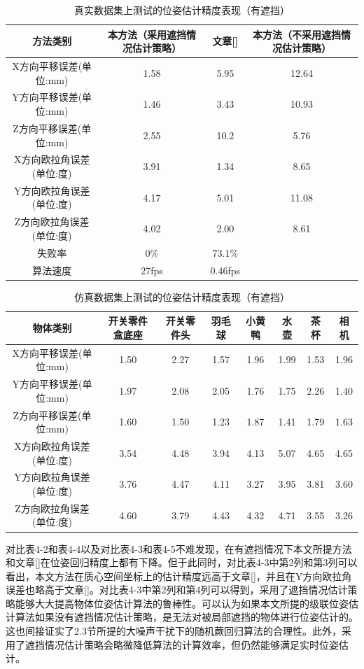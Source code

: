 \begin{table}[htb]
	\caption{真实数据集上测试的位姿估计精度表现（有遮挡）} 
	\centering 
	\begin{tabular}[t]{
		cccc} 
		\toprule
		方法类别 & 本方法（采用遮挡情况估计策略） & 文章[\citenum{drost2010model}] & 本方法（不采用遮挡情况估计策略）\\ 
		\midrule
		X方向平移误差(单位:mm) & 1.58 & 5.95 & 12.64\\
		Y方向平移误差(单位:mm) & 1.46 & 3.43 & 10.93\\
		Z方向平移误差(单位:mm) & 2.55 & 10.2 & 5.76\\
		X方向欧拉角误差(单位:度) & 3.91 & 1.34 & 8.65\\
		Y方向欧拉角误差(单位:度) & 4.17 & 5.01 & 11.08\\
		Z方向欧拉角误差(单位:度) & 4.02 & 2.00 & 8.61\\
		\midrule
		失败率 & 0\% & 73.1\% & \/\\
		\midrule
		算法速度 & 27fps & 0.46fps & \/ \\
		\bottomrule
	\end{tabular}
\end{table}

\begin{table}[htb]
	\caption{仿真数据集上测试的位姿估计精度表现（有遮挡）} 
	\centering 
	\begin{tabular}[t]{
		cccccccc} 
		\toprule
		物体类别 & 开关零件盒底座 & 开关零件头 & 羽毛球 & 小黄鸭 & 水壶 & 茶杯 & 相机\\ 
		\midrule
		X方向平移误差(单位:mm) &1.50&2.27&1.57&1.96&1.99&1.53&1.96 \\
		Y方向平移误差(单位:mm) & 1.97 & 2.08 & 2.05&1.76&1.75&2.26&1.40 \\
		Z方向平移误差(单位:mm) &1.60&1.50&1.23&1.87&1.41&1.79&1.63 \\
		X方向欧拉角误差(单位:度) &3.54&4.48&3.94&4.13&5.07&4.65&4.65 \\
		Y方向欧拉角误差(单位:度) &3.76&4.47&4.11&3.27&3.95&3.81&3.60 \\
		Z方向欧拉角误差(单位:度) &4.60&3.79&4.43&4.32&4.71&3.55&3.26 \\
		\bottomrule
	\end{tabular}
\end{table}

对比表4-2和表4-4以及对比表4-3和表4-5不难发现，在有遮挡情况下本文所提方法和文章[]在位姿回归精度上都有下降。但于此同时，对比表4-3中第2列和第3列可以看出，本文方法在质心空间坐标上的估计精度远高于文章[]，并且在Y方向欧拉角误差也略高于文章[]。对比表4-3中第2列和第4列可以得到，采用了遮挡情况估计策略能够大大提高物体位姿估计算法的鲁棒性。可以认为如果本文所提的级联位姿估计算法如果没有遮挡情况估计策略，是无法对被局部遮挡的物体进行位姿估计的。这也间接证实了2.3节所提的大噪声干扰下的随机蕨回归算法的合理性。此外，采用了遮挡情况估计策略会略微降低算法的计算效率，但仍然能够满足实时位姿估计。

